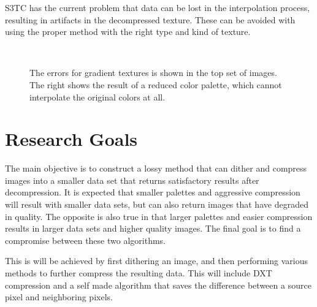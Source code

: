 \documentclass[12pt]{CPP}
\begin{document}
S3TC has the current problem that data can be lost in the interpolation process, resulting in artifacts in the decompressed texture. These can be avoided with using the proper method with the right type and kind of texture. \citep{Iourcha1999}

\begin{figure}[!htbp]
\begin{center}
\\
\end{center}
\caption{The errors for gradient textures is shown in the top set of images. The right shows the result of a reduced color palette, which cannot interpolate the original colors at all.}
\end{figure}

\clearpage
\newpage
\section{Research Goals}

The main objective is to construct a lossy method that can dither and compress images into a smaller data set that returns satisfactory results after decompression. It is expected that smaller palettes and aggressive compression will result with smaller data sets, but can also return images that have degraded in quality. The opposite is also true in that larger palettes and easier compression results in larger data sets and higher quality images. The final goal is to find a compromise between these two algorithms.

This is will be achieved by first dithering an image, and then performing various methods to further compress the resulting data. This will include DXT compression and a self made algorithm that saves the difference between a source pixel and neighboring pixels.
\end{document}
